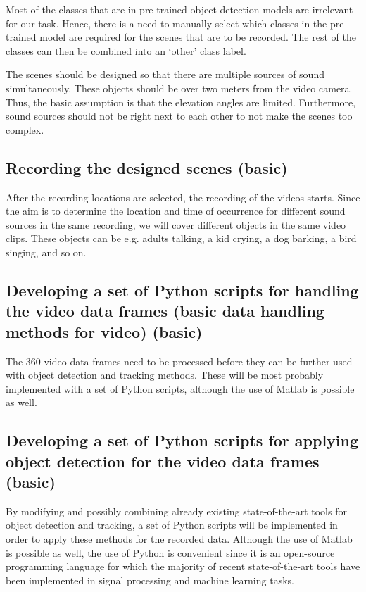 Most of the classes that are in pre-trained object detection models are irrelevant for our task. Hence, there is a
need to manually select which classes in the pre-trained model are required for the scenes that are to be 
recorded. The rest of the classes can then be combined into an `other' class label.

The scenes should be designed so that there are multiple sources of sound simultaneously. These objects should
be over two meters from the video camera. Thus, the basic assumption is that the elevation angles are limited.
Furthermore, sound sources should not be right next to each other to not make the scenes too complex.

\subsection{Recording the designed scenes (basic)}

After the recording locations are selected, the recording of the videos starts. Since the aim is to determine 
the location and time of occurrence for different sound sources in the same recording, we will cover different
objects in the same video clips. These objects can be e.g. adults talking, a kid crying, a dog barking, a bird
singing, and so on.

\subsection{Developing a set of Python scripts for handling the video data frames (basic data handling methods for video) (basic)}

The 360 video data frames need to be processed before they can be further used with object detection and
tracking methods. These will be most probably implemented with a set of Python scripts, although the use of Matlab
is possible as well.

\subsection{Developing a set of Python scripts for applying object detection for the video data frames (basic)}

By modifying and possibly combining already existing state-of-the-art tools for object detection and tracking, a
set of Python scripts will be implemented in order to apply these methods for the recorded data. Although the use
of Matlab is possible as well, the use of Python is convenient since it is an open-source programming language for
which the majority of recent state-of-the-art tools have been implemented in signal processing and machine 
learning tasks.

